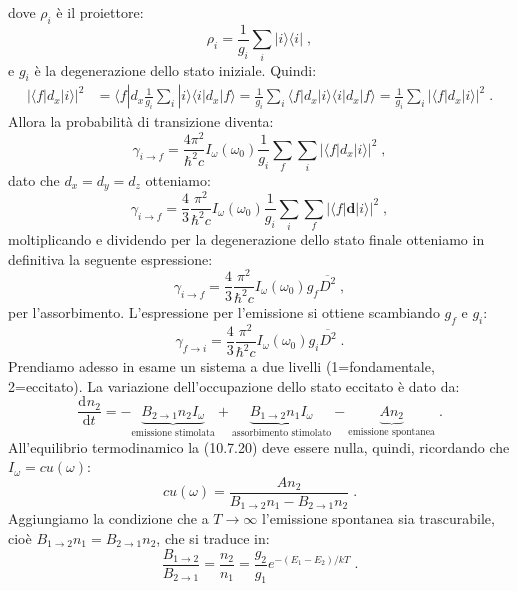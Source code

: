 \documentclass[10pt,a4paper]{report}
\theoremstyle{definition}
\newcommand{\dev}[3][]{\frac{\mathrm{d}^{#1} #2}{\mathrm{d} #3^{#1}}}
\numberwithin{equation}{section}
\newcommand{\bra}{\langle}
\newcommand{\ket}{\rangle}
\begin{document}
dove $\rho_i$ è il proiettore:
\begin{equation}
\rho_i=\frac{1}{g_i}\sum_i |i\ket\bra i|\;,
\end{equation}
e $g_i$ è la degenerazione dello stato iniziale. Quindi:
\begin{align}
|\bra f|d_x|i\ket|^2 &= \bra f|d_x \frac{1}{g_i}\sum_i|i\ket\bra i|d_x|f\ket= \frac{1}{g_i}\sum_i \bra f|d_x|i\ket\bra i|d_x|f\ket= \frac{1}{g_i}\sum_i |\bra f|d_x|i\ket|^2\;.
\end{align}
Allora la probabilità di transizione diventa:
\begin{equation}
\gamma_{i\to f}=\frac{4\pi^2}{\hbar^2 c}I_{\omega}(\omega_0)\frac{1}{g_i}\sum_f\sum_i|\bra f|d_x|i\ket|^2\;,
\end{equation}
dato che $d_x=d_y=d_z$ otteniamo:
\begin{equation}
\gamma_{i\to f}=\frac{4}{3}\frac{\pi^2}{\hbar^2 c}I_{\omega}(\omega_0)\frac{1}{g_i}\sum_i\sum_f|\bra f|\mathbf{d}|i\ket|^2\;,
\end{equation}
moltiplicando e dividendo per la degenerazione dello stato finale otteniamo in definitiva la seguente espressione:
\begin{equation}
\gamma_{i\to f}=\frac{4}{3}\frac{\pi^2}{\hbar^2 c}I_{\omega}(\omega_0)g_f\overline{D^2}\;,
\end{equation}
per l'assorbimento. L'espressione per l'emissione si ottiene scambiando $g_f$ e $g_i$:
\begin{equation}
\gamma_{f\to i}=\frac{4}{3}\frac{\pi^2}{\hbar^2 c}I_{\omega}(\omega_0)g_i\overline{D^2}\;.
\end{equation}
Prendiamo adesso in esame un sistema a due livelli (1=fondamentale, 2=eccitato). La variazione dell'occupazione dello stato eccitato è dato da:
\begin{equation}
\dev{n_2}{t}=-\underbrace{B_{2\to 1}n_2I_{\omega}}_{\mbox{emissione stimolata}}+\underbrace{B_{1\to2}n_1I_{\omega}}_{\mbox{assorbimento stimolato}}-\underbrace{An_2}_{\mbox{emissione spontanea}}\;.
\end{equation}
All'equilibrio termodinamico la (10.7.20) deve essere nulla, quindi, ricordando che $I_{\omega}=cu(\omega)$:
\begin{equation}
cu(\omega)=\frac{An_2}{B_{1\to 2}n_1-B_{2\to 1}n_2}\;.
\end{equation}
Aggiungiamo la condizione che a $T\to\infty$ l'emissione spontanea sia trascurabile, cioè $B_{1\to 2}n_1=B_{2\to 1}n_2$, che si traduce in:
\begin{equation}
\frac{B_{1\to 2}}{B_{2\to 1}}=\frac{n_2}{n_1}=\frac{g_2}{g_1}e^{-(E_1-E_2)/kT}\;.
\end{equation}
\end{document}
